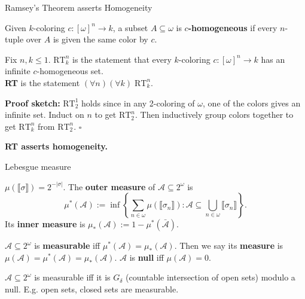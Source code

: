 \begin{frame}{Ramsey's Theorem asserts Homogeneity}
  \begin{define*}[$c$-homogeneous]
    Given $k$-coloring $c:[\omega]^n\rightarrow k$, a subset
    $A\subseteq\omega$ is \textbf{$c$-homogeneous} if every $n$-tuple over
    $A$ is given the same color by $c$.
  \end{define*}

  \vspace{0.5em}
  \begin{thm*}[Ramsey's]
    Fix $n,k\leq1$. \textbf{$\text{RT}_k^n$} is the statement that every
    $k$-coloring $c:[\omega]^n\rightarrow k$ has an infinite
    $c$-homogeneous set.\\
    \vspace{0.5em}
    \textbf{RT} is the statement $(\forall n)(\forall k)\; \text{RT}_k^n$.
  \end{thm*}
  \textbf{Proof sketch:} $\text{RT}_2^1$ holds since in any 2-coloring of
  $\omega$, one of the colors gives an infinite set. Induct on $n$ to get
  $\text{RT}_2^n$. Then inductively group colors together to get
  $\text{RT}_k^n$ from $\text{RT}_2^n$. $\square$

  \vspace{0.5em}
  \textbf{RT asserts homogeneity.}
\end{frame}

\begin{frame}{Lebesgue measure}
  \begin{define*}
    $\mu(\llbracket\sigma\rrbracket) =2^{-|\sigma|}$. The \textbf{outer
    measure} of $\mathcal{A}\subseteq2^\omega$ is
    \[\mu^*(\mathcal{A}):= \inf\left\{\sum_{n\in\omega}
    \mu(\llbracket\sigma_n\rrbracket): \mathcal{A}\subseteq
    \bigcup_{n\in\omega} \llbracket\sigma_n\rrbracket\right\}.\]
    Its \textbf{inner measure} is $\mu_*(\mathcal{A}):=
    1-\mu^*(\bar{\mathcal{A}})$.
  \end{define*}

  \begin{define*}
    $\mathcal{A}\subseteq2^\omega$ is \textbf{measurable} iff
    $\mu^*(\mathcal{A}) =\mu_*(\mathcal{A})$.  Then we say its
    \textbf{measure} is $\mu(\mathcal{A}) =\mu^*(\mathcal{A})
    =\mu_*(\mathcal{A})$. $\mathcal{A}$ is \textbf{null} iff
    $\mu(\mathcal{A})=0$.
  \end{define*}
  \begin{fact*}[Measurable]
    $\mathcal{A}\subseteq2^\omega$ is measurable iff it is
    $G_\delta$ (countable intersection of open sets) modulo a null. E.g.
    open sets, closed sets are measurable.
  \end{fact*}
\end{frame}

